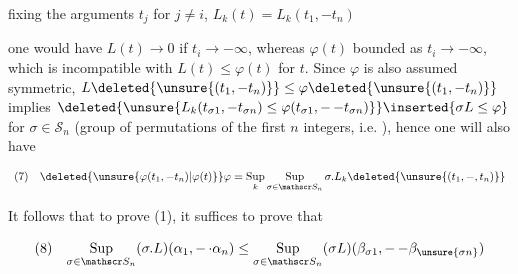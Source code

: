 
fixing the arguments $t_j$ for $j\ne i$, $L_k(t)=L_k(t_1,-t_n)$ \newline
{}\newline
{}

one would have $L(t)\to0$ if $t_i\to-\infty$, whereas $\varphi(t)$  bounded as $t_i\to-\infty$, which  is incompatible with $L(t)\leq\varphi(t)$ for  $t$.  Since  $\varphi$ is also assumed symmetric, $L\deleted{\unsure{(t_1,-t_n)}}\leq\varphi\deleted{\unsure{(t_1,-t_n)}}$  implies $\deleted{\unsure{L_k(t_{\sigma1},-t_{\sigma n})\leq\varphi(t_{\sigma1},\mathord{-}\,\mathord{-}t_{\sigma n})}}\inserted{\sigma L\leq\varphi}$ for  $\sigma\in\mathscr S_n$ (group of permutations of the first $n$ integers, i.e. ), hence one will also have

\[
\begin{array}{ll}
(7)&\displaystyle\deleted{\unsure{\varphi(t_1,-t_n)|\varphi(t)}}\varphi=\operatorname*{Sup}_k\operatorname*{Sup}_{\sigma\in\mathscr S_n}\sigma.L_k\deleted{\unsure{(t_1,-,t_n)}}
\end{array}
\]

It follows that  to prove (1), it suffices to prove that  

\[
\begin{array}{ll}
(8)&\displaystyle\operatorname*{Sup}_{\sigma\in\mathscr S_n}(\sigma.L)(\alpha_1,\mathord{-}\,\mathord{\cdot}\alpha_n)\leq\operatorname*{Sup}_{\sigma\in\mathscr S_n}(\sigma L)(\beta_{\sigma1},\mathord{-}\,\mathord{-}\beta_{\unsure{\sigma n}})
\end{array}
\]

